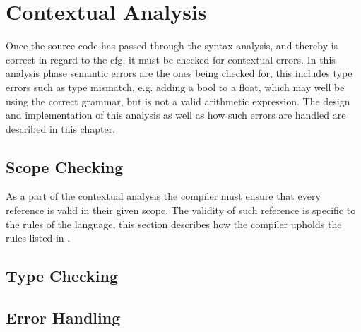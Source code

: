 


\chapter{Contextual Analysis}
Once the source code has passed through the syntax analysis, and thereby is correct in regard to the \acrshort{cfg}, it must be checked for contextual errors.
In this analysis phase semantic errors are the ones being checked for, this includes type errors such as type mismatch, e.g. adding a bool to a float, which may well be using the correct grammar, but is not a valid arithmetic expression.
The design and implementation of this analysis as well as how such errors are handled are described in this chapter.



\section{Scope Checking}
As a part of the contextual analysis the compiler must ensure that every reference is valid in their given scope.
The validity of such reference is specific to the rules of the language, this section describes how the compiler upholds the rules listed in .


\section{Type Checking}


\section{Error Handling}




